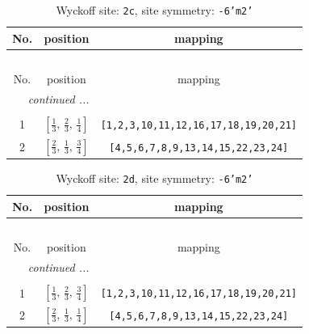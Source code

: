 \documentclass[fleqn,8pt]{jsarticle}
\begin{document}
\renewcommand{\arraystretch}{1.2}
\begin{longtable}{ccc}
\caption{Wyckoff site: {\tt 2c}, site symmetry: {\tt -6'm2'}}
 \\
 \hline \hline
No. & position & mapping \\ \hline \endfirsthead

\multicolumn{2}{l}{\tablename\ \thetable{}} \\
 \hline \hline
No. & position & mapping \\ \hline \endhead

 \hline \hline
\multicolumn{2}{r}{\footnotesize\it continued ...} \\ \endfoot

 \hline \hline
\multicolumn{2}{r}{} \\ \endlastfoot

1 & $\left[ \frac{1}{3},\, \frac{2}{3},\, \frac{1}{4} \right]$ & {\tt [1,2,3,10,11,12,16,17,18,19,20,21]} \\ \hline
2 & $\left[ \frac{2}{3},\, \frac{1}{3},\, \frac{3}{4} \right]$ & {\tt [4,5,6,7,8,9,13,14,15,22,23,24]} \\
\end{longtable}
\renewcommand{\arraystretch}{1.2}
\begin{longtable}{ccc}
\caption{Wyckoff site: {\tt 2d}, site symmetry: {\tt -6'm2'}}
 \\
 \hline \hline
No. & position & mapping \\ \hline \endfirsthead

\multicolumn{2}{l}{\tablename\ \thetable{}} \\
 \hline \hline
No. & position & mapping \\ \hline \endhead

 \hline \hline
\multicolumn{2}{r}{\footnotesize\it continued ...} \\ \endfoot

 \hline \hline
\multicolumn{2}{r}{} \\ \endlastfoot

1 & $\left[ \frac{1}{3},\, \frac{2}{3},\, \frac{3}{4} \right]$ & {\tt [1,2,3,10,11,12,16,17,18,19,20,21]} \\ \hline
2 & $\left[ \frac{2}{3},\, \frac{1}{3},\, \frac{1}{4} \right]$ & {\tt [4,5,6,7,8,9,13,14,15,22,23,24]} \\
\end{longtable}
\renewcommand{\arraystretch}{1.2}
\end{document}
